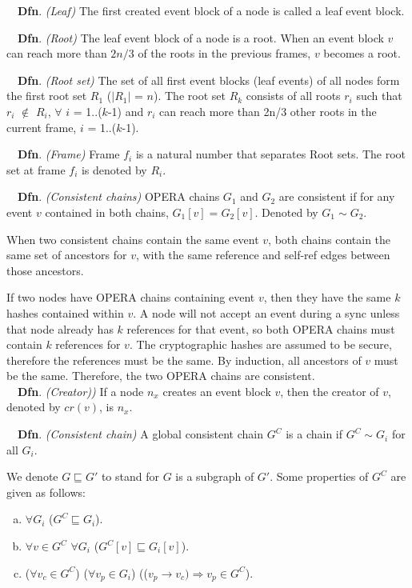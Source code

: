 \documentclass{article}
\newcommand{\dfnn}[2]{$\quad$\textbf{Dfn}. \emph{(#1)} {#2}}
\newcommand{\hbefore}{\rightarrow}
\begin{document}
\dfnn{Leaf}{The first created event block of a node is called a leaf event block.}

\dfnn{Root}{The leaf event block of a node is a root. When an event block $v$ can reach more than $2n/3$ of the roots in the previous frames, $v$ becomes a root.}

\dfnn{Root set}{The set of all first event blocks (leaf events) of all nodes form the first root set $R_1$ ($|R_1|$ = $n$). The root set $R_k$ consists of all roots $r_i$ such that $r_i$ $\not \in $ $R_i$, $\forall$ $i$ = 1..($k$-1) and $r_i$ can reach more than 2n/3 other roots in the current frame, $i$ = 1..($k$-1).}

\dfnn{Frame}{Frame $f_i$ is a natural number that separates Root sets. The root set at frame $f_i$ is denoted by $R_i$.}

\dfnn{Consistent chains}{OPERA chains $G_1$ and $G_2$ are consistent if for any event $v$ contained in both chains, $G_1[v] = G_2[v]$. Denoted by $G_1 \sim G_2$.}

 When two consistent chains contain the same event $v$, both chains contain the same set of ancestors for $v$, with the same reference and self-ref edges between those ancestors.

If two nodes have OPERA chains containing event $v$, then they have the same $k$ hashes contained within $v$. A node will not accept an event during a sync unless that node already has $k$ references for that event, so both OPERA chains must contain $k$ references for $v$. The cryptographic hashes are assumed to be secure, therefore the references must be the same. By induction, all ancestors of $v$ must be the same. Therefore, the two OPERA chains are consistent.\\

\dfnn{Creator)}{If a node $n_x$ creates an event block $v$, then the creator of $v$, denoted by $cr(v)$, is $n_x$.}

\dfnn{Consistent chain}{A global consistent chain $G^C$ is a chain if $G^C \sim G_i$ for all $G_i$.}

We denote $G \sqsubseteq G'$ to stand for $G$ is a subgraph of $G'$. Some properties of $G^C$ are given as follows:
\begin{enumerate}[(a)]
	\item $\forall G_i$ ($G^C \sqsubseteq G_i$).
	\item
	$\forall v \in G^C$ $\forall G_i$ ($G^C[v] \sqsubseteq G_i[v]$).
	\item
	($\forall v_c \in G^C$) ($\forall v_p \in G_i$) (($v_p \hbefore v_c) \Rightarrow v_p \in G^C$).
\end{enumerate}
\end{document}
